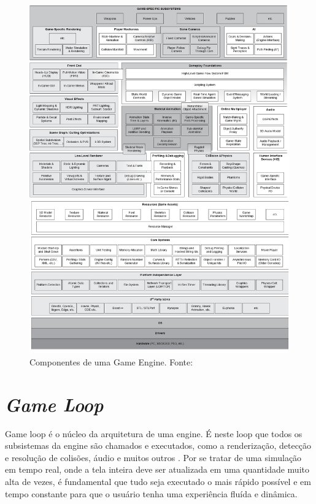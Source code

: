 \documentclass[12pt, 
openright, 
oneside, 
a4paper,    
brazil]{facom-ufu-abntex2}
\begin{document}
\begin{figure}[H]
	\centering
	\includegraphics[width=\textwidth]{imagens/engine_layers.png}
	\caption{Componentes de uma Game Engine. Fonte:~\cite{GameEngineArchitecture}
    \label{fig:arquitetura}}
\end{figure}

\section{\textit{Game Loop}}
Game loop é o núcleo da arquitetura de uma engine. É neste loop que todos os subsistemas da engine são chamados e  executados, como a renderização, detecção e resolução de colisões, áudio e muitos outros \cite{GameEngineArchitecture}. Por se tratar de uma simulação em tempo real, onde a tela inteira deve ser atualizada em uma quantidade muito alta de vezes, é fundamental que tudo seja executado o mais rápido possível e em tempo constante para que o usuário tenha uma experiência fluída e dinâmica.
\end{document}
